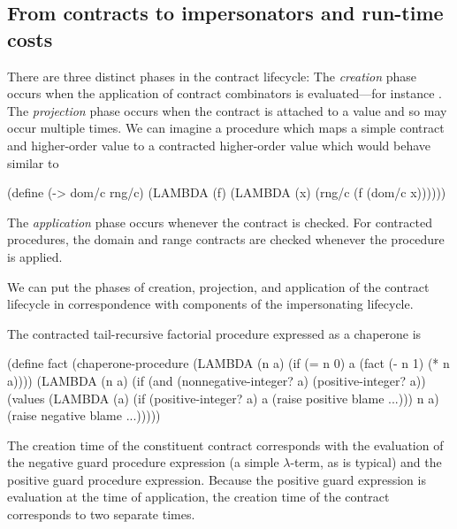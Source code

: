 \documentclass{sigplanconf}
\begin{document}
\subsection{From contracts to impersonators and run-time costs}

There are three distinct phases in the contract lifecycle:
The \emph{creation} phase occurs when the application of contract combinators is evaluated---for instance .
The \emph{projection} phase occurs when the contract is attached to a value and so may occur multiple times.
We can imagine a procedure which maps a simple contract and higher-order value to a contracted higher-order value which would behave similar to
\begin{schemedisplay}
(define (-> dom/c rng/c)
  (LAMBDA (f)
    (LAMBDA (x)
      (rng/c (f (dom/c x))))))
\end{schemedisplay}
The \emph{application} phase occurs whenever the contract is checked.
For contracted procedures, the domain and range contracts are checked whenever the procedure is applied.

We can put the phases of creation, projection, and application of the contract lifecycle in correspondence with components of the impersonating lifecycle.

The contracted tail-recursive factorial procedure expressed as a chaperone is
\begin{schemedisplay}
(define fact (chaperone-procedure
              (LAMBDA (n a)
                (if (= n 0)
                    a
                    (fact (- n 1) (* n a))))
              (LAMBDA (n a)
                (if (and (nonnegative-integer? a)
                         (positive-integer? a))
                    (values (LAMBDA (a)
                              (if (positive-integer? a)
                                  a
                                  (raise positive blame ...)))
                            n a)
                    (raise negative blame ...)))))
\end{schemedisplay}

The creation time of the constituent contract corresponds with the evaluation of the negative guard procedure expression (a simple $\lambda$-term, as is typical) and the positive guard procedure expression.
Because the positive guard expression is evaluation at the time of application, the creation time of the contract corresponds to two separate times.
\end{document}
